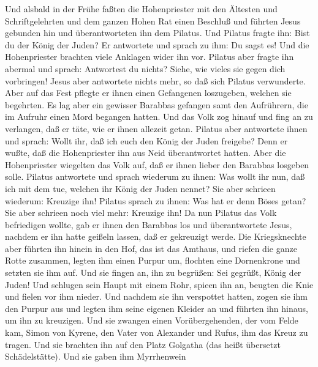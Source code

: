  Und alsbald in der Frühe faßten die Hohenpriester mit den
Ältesten und Schriftgelehrten und dem ganzen Hohen Rat einen Beschluß
und führten Jesus gebunden hin und überantworteten ihn dem Pilatus.
 Und Pilatus fragte ihn: Bist du der König der Juden? Er
antwortete und sprach zu ihm: Du sagst es!  Und die
Hohenpriester brachten viele Anklagen wider ihn vor. 
Pilatus aber fragte ihn abermal und sprach: Antwortest du nichts? Siehe,
wie vieles sie gegen dich vorbringen!  Jesus aber
antwortete nichts mehr, so daß sich Pilatus verwunderte. 
Aber auf das Fest pflegte er ihnen einen Gefangenen loszugeben, welchen
sie begehrten.  Es lag aber ein gewisser Barabbas gefangen
samt den Aufrührern, die im Aufruhr einen Mord begangen hatten.
 Und das Volk zog hinauf und fing an zu verlangen, daß er
täte, wie er ihnen allezeit getan.  Pilatus aber
antwortete ihnen und sprach: Wollt ihr, daß ich euch den König der Juden
freigebe?  Denn er wußte, daß die Hohenpriester ihn aus
Neid überantwortet hatten.  Aber die Hohenpriester
wiegelten das Volk auf, daß er ihnen lieber den Barabbas losgeben solle.
 Pilatus antwortete und sprach wiederum zu ihnen: Was
wollt ihr nun, daß ich mit dem tue, welchen ihr König der Juden nennet?
 Sie aber schrieen wiederum: Kreuzige ihn!
 Pilatus sprach zu ihnen: Was hat er denn Böses getan?
Sie aber schrieen noch viel mehr: Kreuzige ihn!  Da nun
Pilatus das Volk befriedigen wollte, gab er ihnen den Barabbas los und
überantwortete Jesus, nachdem er ihn hatte geißeln lassen, daß er
gekreuzigt werde.  Die Kriegsknechte aber führten ihn
hinein in den Hof, das ist das Amthaus, und riefen die ganze Rotte
zusammen,  legten ihm einen Purpur um, flochten eine
Dornenkrone und setzten sie ihm auf.  Und sie fingen an,
ihn zu begrüßen: Sei gegrüßt, König der Juden!  Und
schlugen sein Haupt mit einem Rohr, spieen ihn an, beugten die Knie und
fielen vor ihm nieder.  Und nachdem sie ihn verspottet
hatten, zogen sie ihm den Purpur aus und legten ihm seine eigenen
Kleider an und führten ihn hinaus, um ihn zu kreuzigen. 
Und sie zwangen einen Vorübergehenden, der vom Felde kam, Simon von
Kyrene, den Vater von Alexander und Rufus, ihm das Kreuz zu tragen.
 Und sie brachten ihn auf den Platz Golgatha (das heißt
übersetzt Schädelstätte).  Und sie gaben ihm Myrrhenwein
